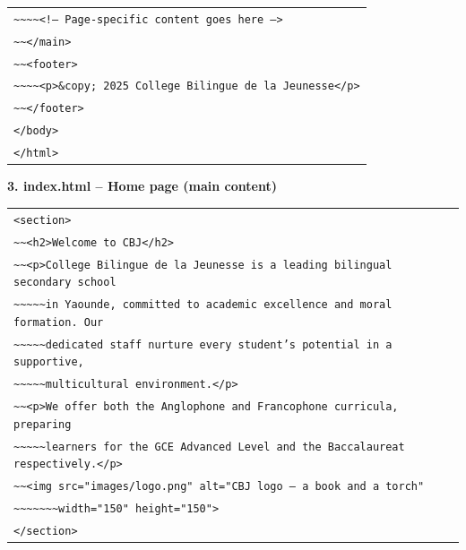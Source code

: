 \documentclass[11pt]{article}
\begin{document}
\begin{center}
\begin{tabular}{l}
\texttt{\textasciitilde{}\textasciitilde{}\textasciitilde{}\textasciitilde{}<!-- Page-specific content goes here -->} \\
\texttt{\textasciitilde{}\textasciitilde{}</main>} \\
\texttt{\textasciitilde{}\textasciitilde{}<footer>} \\
\texttt{\textasciitilde{}\textasciitilde{}\textasciitilde{}\textasciitilde{}<p>\&copy; 2025 College Bilingue de la Jeunesse</p>} \\
\texttt{\textasciitilde{}\textasciitilde{}</footer>} \\
\texttt{</body>} \\
\texttt{</html>}
\end{tabular}
\end{center}

\textbf{3. index.html -- Home page (main content)}
\begin{center}
\begin{tabular}{l}
\texttt{<section>} \\
\texttt{\textasciitilde{}\textasciitilde{}<h2>Welcome to CBJ</h2>} \\
\texttt{\textasciitilde{}\textasciitilde{}<p>College Bilingue de la Jeunesse is a leading bilingual secondary school} \\
\texttt{\textasciitilde{}\textasciitilde{}\textasciitilde{}\textasciitilde{}\textasciitilde{}in Yaounde, committed to academic excellence and moral formation. Our} \\
\texttt{\textasciitilde{}\textasciitilde{}\textasciitilde{}\textasciitilde{}\textasciitilde{}dedicated staff nurture every student's potential in a supportive,} \\
\texttt{\textasciitilde{}\textasciitilde{}\textasciitilde{}\textasciitilde{}\textasciitilde{}multicultural environment.</p>} \\
\texttt{\textasciitilde{}\textasciitilde{}<p>We offer both the Anglophone and Francophone curricula, preparing} \\
\texttt{\textasciitilde{}\textasciitilde{}\textasciitilde{}\textasciitilde{}\textasciitilde{}learners for the GCE Advanced Level and the Baccalaureat respectively.</p>} \\
\texttt{\textasciitilde{}\textasciitilde{}<img src="images/logo.png" alt="CBJ logo -- a book and a torch"} \\
\texttt{\textasciitilde{}\textasciitilde{}\textasciitilde{}\textasciitilde{}\textasciitilde{}\textasciitilde{}\textasciitilde{}width="150" height="150">} \\
\texttt{</section>}
\end{tabular}
\end{center}
\end{document}
